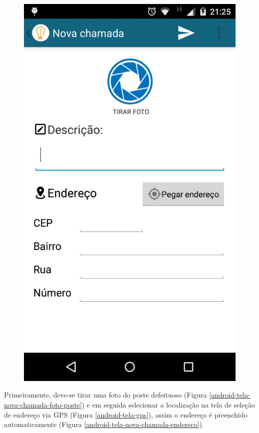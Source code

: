 \documentclass[
	article,			%
	11pt,				%
	oneside,			%
	a4paper,			%
	english,			%
	brazil,				%
	sumario=tradicional
	]{abntex2}
\begin{document}
\begin{figure}[!htbp]
\begin{minipage}{0.4\textwidth}
    \includegraphics[scale=0.1]{android/2.png}
  \end{minipage}
\end{figure}

Primeiramente, deve-se tirar uma foto do poste defeituoso (Figura \ref{android-tela-nova-chamada-foto-poste}) e em seguida selecionar a localização na tela de seleção de endereço via GPS (Figura \ref{android-tela-gps}), assim o endereço é preenchido automaticamente (Figura \ref{android-tela-nova-chamada-endereco}).
\end{document}
